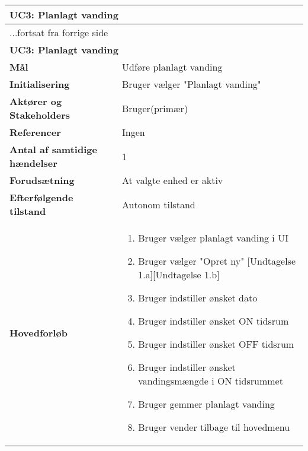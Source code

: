 \begin{center} \centering
	\begin{longtable}{|p{6cm}|p{8cm}|}  %
	\hline
		\multicolumn{2}{|l|}{\textbf{UC3: Planlagt vanding}} \\\hline %
		\endfirsthead
		
		\multicolumn{2}{l}{...fortsat fra forrige side} \\ \hline %
		\multicolumn{2}{|l|}{\textbf{UC3: Planlagt vanding}} \\\hline %
		\endhead	
		
		\textbf{Mål}								&Udføre planlagt vanding			\\\hline
		\textbf{Initialisering}					& Bruger vælger "Planlagt vanding"			\\\hline
		\textbf{Aktører og Stakeholders}			&Bruger(primær)			\\\hline
		\textbf{Referencer}						&Ingen			\\\hline
		\textbf{Antal af samtidige hændelser}	&1 			\\\hline
		\textbf{Forudsætning}					&At valgte enhed er aktiv			\\\hline
		\textbf{Efterfølgende tilstand}			&Autonom tilstand			\\\hline
		\textbf{Hovedforløb}					
			&\begin{enumerate}
	
				\item Bruger vælger planlagt vanding i UI    %
				
				\item Bruger vælger "Opret ny" [Undtagelse 1.a][Undtagelse 1.b]
				
				\item Bruger indstiller ønsket dato
				
				\item Bruger indstiller ønsket ON tidsrum
				
				\item Bruger indstiller ønsket OFF tidsrum
				
				\item Bruger indstiller ønsket vandingsmængde i ON tidsrummet %
				
				\item Bruger gemmer planlagt vanding%
				
				\item Bruger vender tilbage til hovedmenu
	

\end{enumerate}
\end{longtable}
\end{center}
